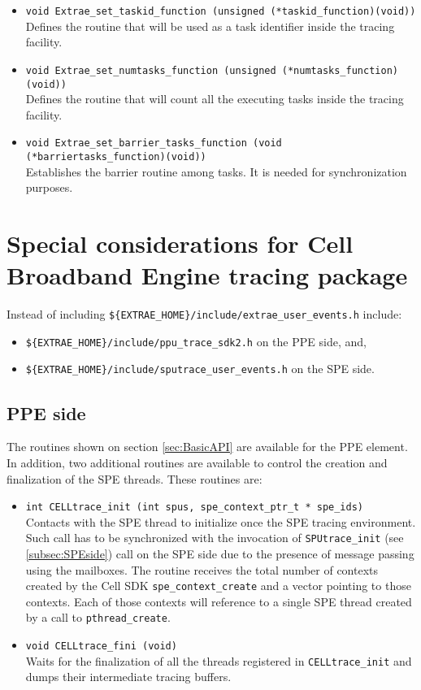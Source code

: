 \begin{itemize}
	\item {\tt void Extrae\_set\_taskid\_function (unsigned (*taskid\_function)(void))}\\
	Defines the routine that will be used as a task identifier inside the tracing facility.
	\item {\tt void Extrae\_set\_numtasks\_function (unsigned (*numtasks\_function)(void))}\\
	Defines the routine that will count all the executing tasks inside the tracing facility.
	\item {\tt void Extrae\_set\_barrier\_tasks\_function (void (*barriertasks\_function)(void))}\\
	Establishes the barrier routine among tasks. It is needed for synchronization purposes.
\end{itemize}

\section{Special considerations for Cell Broadband Engine tracing package}

Instead of including {\tt \$\{EXTRAE\_HOME\}/include/extrae\_user\_events.h} include:
\begin{itemize}
 \item {\tt \$\{EXTRAE\_HOME\}/include/ppu\_trace\_sdk2.h} on the PPE side, and,
 \item {\tt \$\{EXTRAE\_HOME\}/include/sputrace\_user\_events.h} on the SPE side.
\end{itemize}

\subsection{PPE side}\label{subsec:PPEside}

The routines shown on section \ref{sec:BasicAPI} are available for the PPE element. In addition, two additional routines are available to control the creation and finalization of the SPE threads. These routines are:

\begin{itemize}

 \item {\tt int  CELLtrace\_init (int spus, spe\_context\_ptr\_t * spe\_ids)}\\
 Contacts with the SPE thread to initialize once the SPE tracing environment. Such call has to be synchronized with the invocation of {\tt SPUtrace\_init} (see \ref{subsec:SPEside}) call on the SPE side due to the presence of message passing using the mailboxes. The routine receives the total number of contexts created by the Cell SDK {\tt spe\_context\_create} and a vector pointing to those contexts. Each of those contexts will reference to a single SPE thread created by a call to {\tt pthread\_create}.

 \item {\tt void CELLtrace\_fini (void)}\\
 Waits for the finalization of all the threads registered in {\tt CELLtrace\_init} and dumps their intermediate tracing buffers.

\end{itemize}

